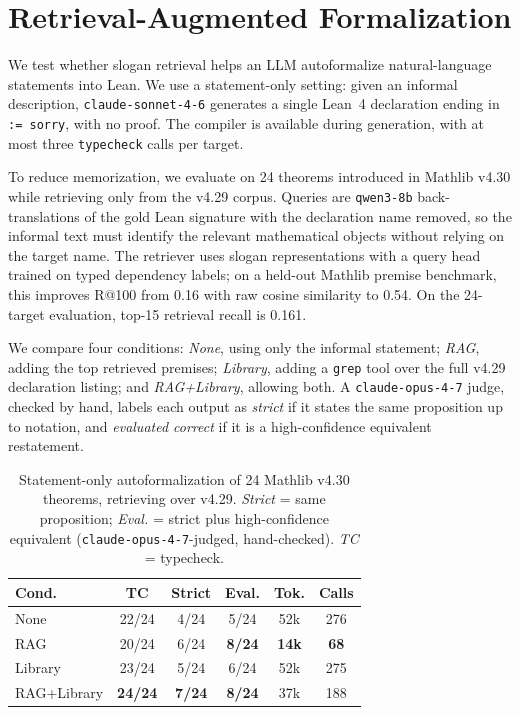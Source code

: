 \section{Retrieval-Augmented Formalization}
\label{sec:exp3}

We test whether slogan retrieval helps an LLM autoformalize natural-language statements into Lean. We use a statement-only setting: given an informal description, \texttt{claude-sonnet-4-6} generates a single Lean~4 declaration ending in \texttt{:= sorry}, with no proof. The compiler is available during generation, with at most three \texttt{typecheck} calls per target.

To reduce memorization, we evaluate on 24 theorems introduced in Mathlib v4.30 while retrieving only from the v4.29 corpus. Queries are \texttt{qwen3-8b} back-translations of the gold Lean signature with the declaration name removed, so the informal text must identify the relevant mathematical objects without relying on the target name. The retriever uses slogan representations with a query head trained on typed dependency labels; on a held-out Mathlib premise benchmark, this improves R@100 from 0.16 with raw cosine similarity to 0.54. On the 24-target evaluation, top-15 retrieval recall is 0.161.

We compare four conditions: \emph{None}, using only the informal statement; \emph{RAG}, adding the top retrieved premises; \emph{Library}, adding a \texttt{grep} tool over the full v4.29 declaration listing; and \emph{RAG+Library}, allowing both. A \texttt{claude-opus-4-7} judge, checked by hand, labels each output as \emph{strict} if it states the same proposition up to notation, and \emph{evaluated correct} if it is a high-confidence equivalent restatement.

\begin{table}[t]
  \centering
  \scriptsize
  \setlength{\tabcolsep}{3.5pt}
  \begin{tabular}{lccccc}
    \toprule
    \textbf{Cond.} & \textbf{TC} & \textbf{Strict} & \textbf{Eval.} & \textbf{Tok.} & \textbf{Calls} \\
    \midrule
    None          & 22/24 & 4/24 & 5/24 & 52k & 276 \\
    RAG           & 20/24 & 6/24 & \textbf{8/24} & \textbf{14k} & \textbf{68} \\
    Library       & 23/24 & 5/24 & 6/24 & 52k & 275 \\
    RAG+Library   & \textbf{24/24} & \textbf{7/24} & \textbf{8/24} & 37k & 188 \\
    \bottomrule
  \end{tabular}
  \caption{Statement-only autoformalization of 24 Mathlib v4.30 theorems, retrieving over v4.29.
  \emph{Strict} = same proposition; \emph{Eval.} = strict plus high-confidence equivalent
  (\texttt{claude-opus-4-7}-judged, hand-checked). \emph{TC} = typecheck.}
  \label{tab:formalize}
\end{table}


